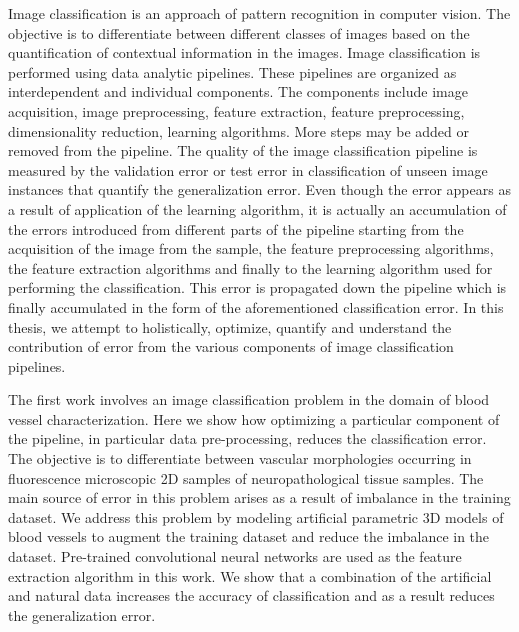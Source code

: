 
Image classification is an approach of pattern recognition in computer vision. The objective is to differentiate between different classes of images based on the quantification of contextual information in the images. Image classification is performed using data analytic pipelines. These pipelines are organized as interdependent and individual components. The components include image acquisition, image preprocessing, feature extraction, feature preprocessing, dimensionality reduction, learning algorithms. More steps may be added or removed from the pipeline. The quality of the image classification pipeline is measured by the validation error or test error in classification of unseen image instances that quantify the generalization error. Even though the error appears as a result of application of the learning algorithm, it is actually an accumulation of the errors introduced from different parts of the pipeline starting from the acquisition of the image from the sample, the feature preprocessing algorithms, the feature extraction algorithms and finally to the learning algorithm used for performing the  classification. This error is propagated down the pipeline which is finally accumulated in the form of the aforementioned classification error. In this thesis, we attempt to holistically, optimize, quantify and understand the contribution of error from the various components of image classification pipelines.   


The first work involves an image classification problem in the domain of blood vessel characterization. Here we show how optimizing a particular component of the pipeline, in particular data pre-processing, reduces the classification error. The objective is to differentiate between vascular morphologies occurring in fluorescence microscopic 2D samples of neuropathological tissue samples. The main source of error in this problem arises as a result of imbalance in the training dataset. We address this problem by modeling artificial parametric 3D models of blood vessels to augment the training dataset and reduce the imbalance in the dataset. Pre-trained convolutional neural networks are used as the feature extraction algorithm in this work. We show that a combination of the artificial and natural data increases the accuracy of classification and as a result reduces the generalization error.


